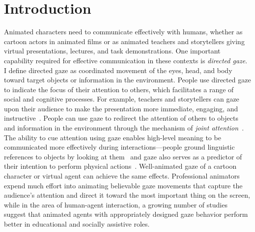 


\pagestyle{deposit}

\chapter{Introduction}

Animated characters need to communicate effectively with humans, whether as cartoon actors in animated films or as animated teachers and storytellers giving virtual presentations, lectures, and task demonstrations. One important capability required for effective communication in these contexts is \emph{directed gaze}. I define directed gaze as coordinated movement of the eyes, head, and body toward target objects or information in the environment. People use directed gaze to indicate the focus of their attention to others, which facilitates a range of social and cognitive processes. For example, teachers and storytellers can gaze upon their audience to make the presentation more immediate, engaging, and instructive~\citep{fullwood2006effect,sherwood1987facilitative,otteson1980effect}. People can use gaze to redirect the attention of others to objects and information in the environment through the mechanism of \emph{joint attention}~\citep{dentremont2007early}. The ability to cue attention using gaze enables high-level meaning to be communicated more effectively during interactions---people ground linguistic references to objects by looking at them~\citep{hanna2007speakers,preissler2005role} and gaze also serves as a predictor of their intention to perform physical actions~\citep{strabala2012learning}. Well-animated gaze of a cartoon character or virtual agent can achieve the same effects. Professional animators expend much effort into animating believable gaze movements that capture the audience's attention and direct it toward the most important thing on the screen, while in the area of human-agent interaction, a growing number of studies~\citep{andrist2012designing,andrist2013aversion,mutlu2006storytelling} suggest that animated agents with appropriately designed gaze behavior perform better in educational and socially assistive roles.

